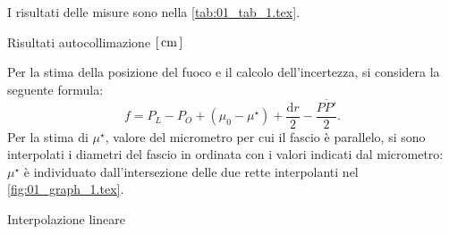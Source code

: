 

I risultati delle misure sono nella \autoref{tab:01_tab_1.tex}.
\begin{tabella}
	\centering
	
	\caption{Risultati autocollimazione $[\,\mathrm{cm}\,]$}
	\label{tab:01_tab_1.tex}
\end{tabella}
Per la stima della posizione del fuoco e il calcolo dell'incertezza, si considera la seguente formula:
\begin{equation} 
f = P_L - P_O + \left(\mu _0 - \mu ^{\star}\right) + \frac{\mathrm{d}r}{2} - \frac{\overline{PP'}}{2}.
\end{equation}
Per la stima di $ \mu ^{\star} $, valore del micrometro per cui il fascio \`e parallelo, si sono interpolati i diametri del fascio in ordinata con i valori indicati dal micrometro: $ \mu ^{\star}$ \`e individuato dall'intersezione delle due rette interpolanti nel \autoref{fig:01_graph_1.tex}.

\begin{grafico} \centering  \caption{Interpolazione lineare} \label{fig:01_graph_1.tex} \end{grafico}

